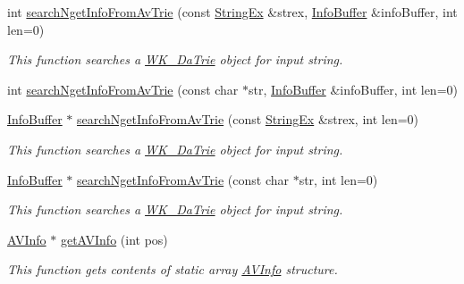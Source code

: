 \begin{CompactItemize}
int \hyperlink{classkmaOrange_1_1AuxVerb_683102149981c86b57cf5331a89f05b9}{searchNgetInfoFromAvTrie} (const \hyperlink{classStringEx}{StringEx} \&strex, \hyperlink{classkmaOrange_1_1InfoBuffer}{InfoBuffer} \&infoBuffer, int len=0)
\begin{CompactList}\small\item\em This function searches a \hyperlink{classkmaOrange_1_1WK__DaTrie}{WK\_\-DaTrie} object for input string. \item\end{CompactList}\item 
int \hyperlink{classkmaOrange_1_1AuxVerb_23873257b24cdd49b86a54b9dee21c6c}{searchNgetInfoFromAvTrie} (const char $\ast$str, \hyperlink{classkmaOrange_1_1InfoBuffer}{InfoBuffer} \&infoBuffer, int len=0)
\item 
\hyperlink{classkmaOrange_1_1InfoBuffer}{InfoBuffer} $\ast$ \hyperlink{classkmaOrange_1_1AuxVerb_d08311a7c795a29ed267dfdff4e804d3}{searchNgetInfoFromAvTrie} (const \hyperlink{classStringEx}{StringEx} \&strex, int len=0)
\begin{CompactList}\small\item\em This function searches a \hyperlink{classkmaOrange_1_1WK__DaTrie}{WK\_\-DaTrie} object for input string. \item\end{CompactList}\item 
\hyperlink{classkmaOrange_1_1InfoBuffer}{InfoBuffer} $\ast$ \hyperlink{classkmaOrange_1_1AuxVerb_68664b5fafa56a3c08bab09baa569f8f}{searchNgetInfoFromAvTrie} (const char $\ast$str, int len=0)
\begin{CompactList}\small\item\em This function searches a \hyperlink{classkmaOrange_1_1WK__DaTrie}{WK\_\-DaTrie} object for input string. \item\end{CompactList}\item 
\hyperlink{structkmaOrange_1_1AVInfo}{AVInfo} $\ast$ \hyperlink{classkmaOrange_1_1AuxVerb_e56921cf22a0283c83ccbdb24187b6c7}{getAVInfo} (int pos)
\begin{CompactList}\small\item\em This function gets contents of static array \hyperlink{structkmaOrange_1_1AVInfo}{AVInfo} structure. \item\end{CompactList}\end{CompactItemize}
